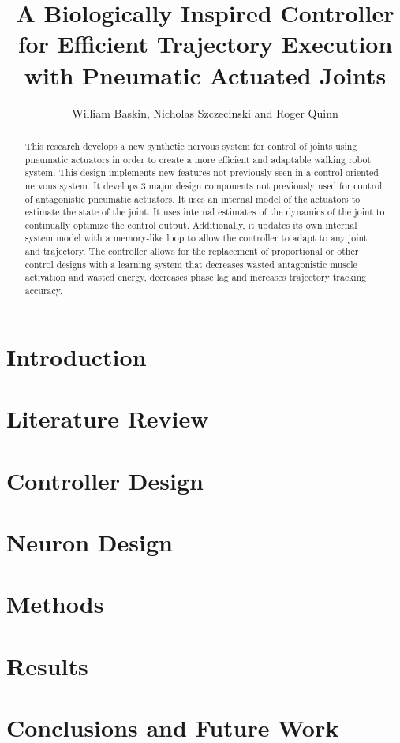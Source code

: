 \documentclass[letterpaper, 10 pt, conference]{IEEEconf} %
\author{William Baskin, Nicholas Szczecinski and Roger Quinn}
\title{
  {A Biologically Inspired Controller for Efficient Trajectory Execution with Pneumatic Actuated Joints}\\
}
\newcommand{\bbs}[1]{\section{#1}}
\begin{document}
\maketitle

\begin{abstract}
\label{chap:abstract}
This research develops a new synthetic nervous system for control of joints using pneumatic actuators in order to create a more efficient and adaptable walking robot system. This design implements new features not previously seen in a control oriented nervous system. It develops 3 major design components not previously used for control of antagonistic pneumatic actuators. It uses an internal model of the actuators to estimate the state of the joint. It uses internal estimates of the dynamics of the joint to continually optimize the control output. Additionally, it updates its own internal system model with a memory-like loop to allow the controller to adapt to any joint and trajectory. The controller allows for the replacement of proportional or other control designs with a learning system that decreases wasted antagonistic muscle activation and wasted energy, decreases phase lag and increases trajectory tracking accuracy.
\end{abstract}

\bbs{Introduction}
\label{chap:introduction}

\bbs{Literature Review}
\label{chap:lit_review}

\cite{einstein}

\bbs{Controller Design}
\label{chap:controller_design}

\bbs{Neuron Design}
\label{chap:neuron_design}

\bbs{Methods}
\label{chap:methods}

\bbs{Results}
\label{chap:results}

\bbs{Conclusions and Future Work}
\label{chap:conclusion}

\newpage
\label{chap:references}
\printbibliography[heading=bibintoc, title={Bibliography}]
\end{document}
